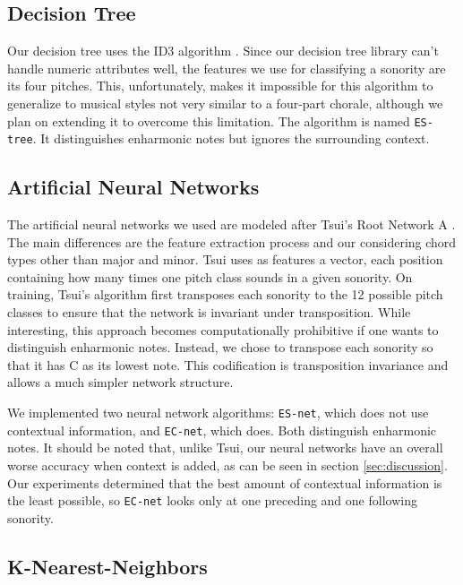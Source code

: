 \subsection{Decision Tree}
\label{sec:tree}

Our decision tree uses the ID3 algorithm \cite{mitchell97:machine}.
Since our decision tree library can't handle numeric attributes well,
the features we use for classifying a sonority are its four
pitches. This, unfortunately, makes it impossible for this algorithm
to generalize to musical styles not very similar to a four-part
chorale, although we plan on extending it to overcome this
limitation. The algorithm is named \texttt{ES-tree}. It distinguishes
enharmonic notes but ignores the surrounding context.

\subsection{Artificial Neural Networks}
\label{sec:neural-net}


The artificial neural networks we used are modeled after Tsui's Root
Network A \cite{tsui02:harmonic}. The main differences are the feature
extraction process and our considering chord types other than major
and minor. Tsui uses as features a vector, each position containing
how many times one pitch class sounds in a given sonority.  On
training, Tsui's algorithm first transposes each sonority to the 12
possible pitch classes to ensure that the network is invariant under
transposition. While interesting, this approach becomes
computationally prohibitive if one wants to distinguish enharmonic
notes. Instead, we chose to transpose each sonority so that it has C
as its lowest note. This codification is transposition invariance and
allows a much simpler network structure.

We implemented two neural network algorithms: \texttt{ES-net}, which
does not use contextual information, and \texttt{EC-net}, which
does. Both distinguish enharmonic notes.  It should be noted that,
unlike Tsui, our neural networks have an overall worse accuracy when
context is added, as can be seen in section \ref{sec:discussion}. Our
experiments determined that the best amount of contextual information
is the least possible, so \texttt{EC-net} looks only at one preceding
and one following sonority.


\subsection{K-Nearest-Neighbors}
\label{sec:knn}

